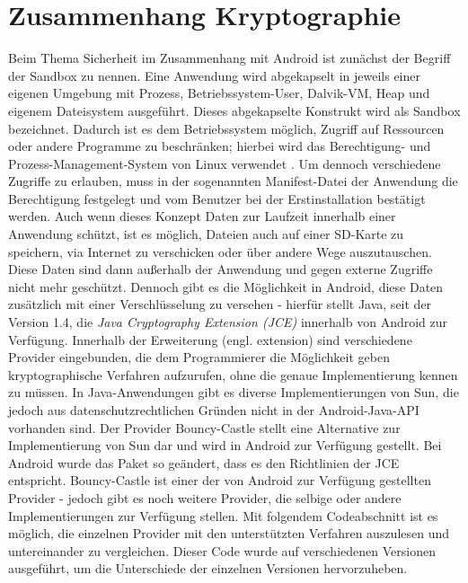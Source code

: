 \documentclass[10pt, a4paper,headsepline,pointednumbers]{scrreprt}
\begin{document}
\section{Zusammenhang Kryptographie}
Beim Thema Sicherheit im Zusammenhang mit Android ist zunächst der Begriff der Sandbox zu nennen. Eine Anwendung wird abgekapselt in jeweils einer eigenen Umgebung mit Prozess, Betriebssystem-User, Dalvik-VM, Heap und eigenem Dateisystem ausgeführt. Dieses abgekapselte Konstrukt wird als Sandbox bezeichnet. Dadurch ist es dem Betriebssystem möglich, Zugriff auf Ressourcen oder andere Programme zu beschränken; hierbei wird das Berechtigung- und Prozess-Management-System von Linux verwendet \citep[S. 33]{book:android44}.
Um dennoch verschiedene Zugriffe zu erlauben, muss in der sogenannten Manifest-Datei der Anwendung die Berechtigung festgelegt und vom Benutzer bei der Erstinstallation bestätigt werden.
Auch wenn dieses Konzept Daten zur Laufzeit innerhalb einer Anwendung schützt, ist es möglich, Dateien auch auf einer SD-Karte zu speichern, via Internet zu verschicken oder über andere Wege auszutauschen. Diese Daten sind dann außerhalb der Anwendung und gegen externe Zugriffe nicht mehr geschützt.
Dennoch gibt es die Möglichkeit in Android, diese Daten zusätzlich mit einer Verschlüsselung zu versehen - hierfür stellt Java, seit der Version 1.4, die \textit{Java Cryptography Extension (JCE)} innerhalb von Android zur Verfügung. Innerhalb der Erweiterung (engl. extension) sind verschiedene Provider eingebunden, die dem Programmierer die Möglichkeit geben kryptographische Verfahren aufzurufen, ohne die genaue Implementierung kennen zu müssen. In Java-Anwendungen gibt es diverse Implementierungen von Sun, die jedoch aus datenschutzrechtlichen Gründen nicht in der Android-Java-API vorhanden sind. Der Provider Bouncy-Castle stellt eine Alternative zur Implementierung von Sun dar und wird in Android zur Verfügung gestellt. Bei Android wurde das Paket so geändert, dass es den Richtlinien der JCE entspricht. 
Bouncy-Castle ist einer der von Android zur Verfügung gestellten Provider - jedoch gibt es noch weitere Provider, die selbige oder andere Implementierungen zur Verfügung stellen. Mit folgendem Codeabschnitt ist es möglich, die einzelnen Provider mit den unterstützten Verfahren auszulesen und untereinander zu vergleichen. Dieser Code wurde auf verschiedenen Versionen ausgeführt, um die Unterschiede der einzelnen Versionen hervorzuheben. \\
\end{document}

